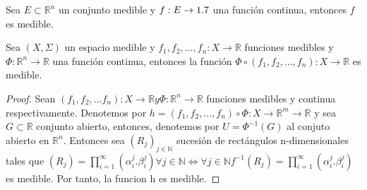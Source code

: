 \begin{corolario}
    Sea $E \subset \mathbb{R}^n$ un conjunto medible y $f: E \to 1.7$ una función continua, entonces $f$ es medible.
\end{corolario}

\begin{proposición}
Sea $(X, \Sigma)$ un espacio medible y $f_1, f_2, \dots, f_n: X \to \mathbb{R}$ funciones medibles y $\Phi: \mathbb{R}^n \to \mathbb{R}$ una función continua, entonces la función $\Phi \circ (f_1, f_2, \dots, f_n): X \to \mathbb{R}$ es medible.
\end{proposición}

\begin{proof}
    Sean $(f_1, f_2, \dots f_n): X \to \mathbb{R} y \Phi: \mathbb{R}^n \to \mathbb{R}$ funciones medibles y continua respectivamente. Denotemos por $h = (f_1, f_2, \dots, f_n) \circ \Phi: X \to \mathbb{R}^m \to \mathbb{R}$ y sea $G \subset \mathbb{R}$ conjunto abierto, entonces, denotemos por $U = \Phi^{-1}(G)$ al conjuto abierto en $\mathbb{R}^n$. Entonces sea $(R_j)_{j\in\mathbb{N}}$ sucesión de rectángulos n-dimensionales tales que $(R_j) = \prod_{i = 1}^{\infty}(\alpha_i^{j}. \beta_i^{j}) \forall j \in \mathbb{N} \iff \forall j \in \mathbb{N} f^{-1}(R_j) = \prod_{i = 1}^{\infty}(\alpha_i^{j}. \beta_i^{j})$ es medible. Por tanto, la funcion h es medible.
\end{proof}

